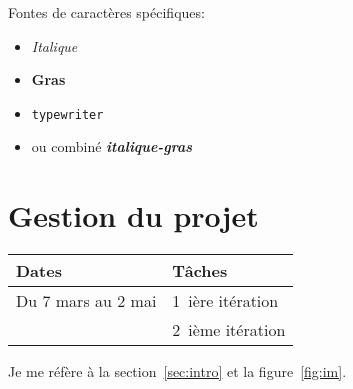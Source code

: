 \documentclass{article}
\begin{document}
Fontes de caractères spécifiques:
\begin{itemize}
\item \emph{Italique}
\item \textbf{Gras}
\item \texttt{typewriter}
\item ou combiné \emph{\textbf{italique-gras}}
\end{itemize}

\section{Gestion du projet}

\begin{tabular}[h]{|l|l|}
\hline
Dates              & Tâches  \\
\hline
\hline
Du 7 mars au 2 mai & 1~ière itération \\
                   & 2~ième  itération \\
\hline
\end{tabular}

Je me réfère à la section~\ref{sec:intro} et la figure~\ref{fig:im}.



\end{document}
